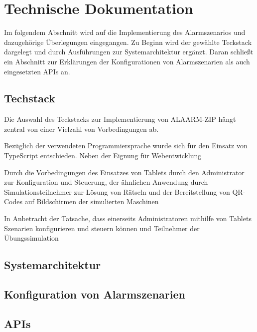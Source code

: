 \section{Technische Dokumentation}

Im folgendem Abschnitt wird auf die Implementierung des Alarmszenarios und dazugehörige Überlegungen eingegangen. Zu Beginn wird der gewählte Teckstack dargelegt und durch Ausführungen zur Systemarchitektur ergänzt. 
Daran schließt ein Abschnitt zur Erklärungen der Konfigurationen von Alarmszenarien als auch eingesetzten APIs an.

\subsection{Techstack}

Die Auswahl des Teckstacks zur Implementierung von ALAARM-ZIP hängt zentral von einer Vielzahl von Vorbedingungen ab.

Bezüglich der verwendeten Programmiersprache wurde sich für den Einsatz von TypeScript entschieden. Neben der Eignung für Webentwicklung

Durch die Vorbedingungen des Einsatzes von Tablets durch den Administrator zur Konfiguration und Steuerung, der ähnlichen Anwendung durch Simulationsteilnehmer zur Lösung von Rätseln und der Bereitstellung von QR-Codes auf Bildschirmen der simulierten Maschinen

In Anbetracht der Tatsache, dass einerseits Administratoren mithilfe von Tablets Szenarien konfigurieren und steuern können und Teilnehmer der Übungssimulation

\subsection{Systemarchitektur}

\subsection{Konfiguration von Alarmszenarien}

\subsection{APIs}